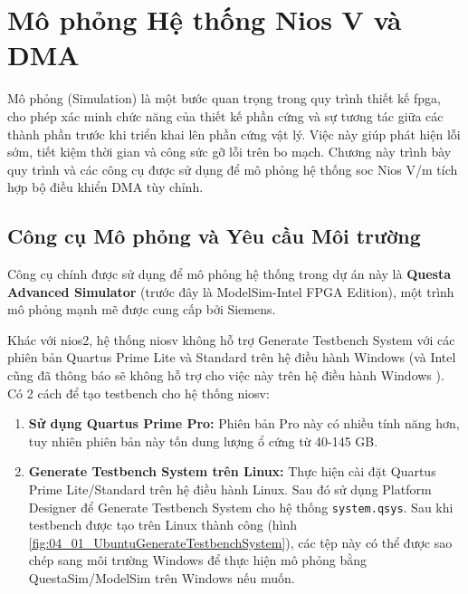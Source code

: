 \chapter{Mô phỏng Hệ thống Nios V và DMA}
\label{Chapter4}

Mô phỏng (Simulation) là một bước quan trọng trong quy trình thiết kế \acrshort{fpga}, cho phép xác minh chức năng của thiết kế phần cứng và sự tương tác giữa các thành phần trước khi triển khai lên phần cứng vật lý. Việc này giúp phát hiện lỗi sớm, tiết kiệm thời gian và công sức gỡ lỗi trên bo mạch. Chương này trình bày quy trình và các công cụ được sử dụng để mô phỏng hệ thống \acrshort{soc} Nios V/m tích hợp bộ điều khiển DMA tùy chỉnh.

\section{Công cụ Mô phỏng và Yêu cầu Môi trường}

Công cụ chính được sử dụng để mô phỏng hệ thống trong dự án này là \textbf{Questa Advanced Simulator} (trước đây là ModelSim-Intel FPGA Edition), một trình mô phỏng mạnh mẽ được cung cấp bởi Siemens.

Khác với \acrshort{nios2}, hệ thống \acrshort{niosv} không hỗ trợ Generate Testbench System với các phiên bản Quartus Prime Lite và Standard trên hệ điều hành Windows (và Intel cũng đã thông báo sẽ không hỗ trợ cho việc này trên hệ điều hành Windows \cite{intel-forum-simulation}). Có 2 cách để tạo testbench cho hệ thống \acrshort{niosv}:

\begin{enumerate}
    \item \textbf{Sử dụng Quartus Prime Pro:} Phiên bản Pro này có nhiều tính năng hơn, tuy nhiên phiên bản này tốn dung lượng ổ cứng từ 40-145 GB.
    \item \textbf{Generate Testbench System trên Linux:} Thực hiện cài đặt Quartus Prime Lite/Standard trên hệ điều hành Linux. Sau đó sử dụng Platform Designer để Generate Testbench System cho hệ thống \texttt{system.qsys}. Sau khi testbench được tạo trên Linux thành công (hình \ref{fig:04_01_UbuntuGenerateTestbenchSystem}), các tệp này có thể được sao chép sang môi trường Windows để thực hiện mô phỏng bằng QuestaSim/ModelSim trên Windows nếu muốn.
\end{enumerate}

